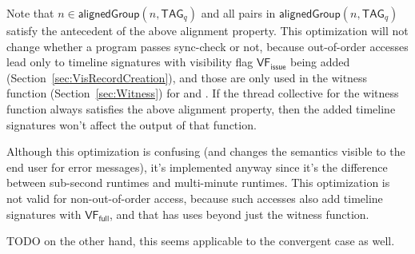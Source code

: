 Note that $n \in \mathsf{alignedGroup}(n, \mathsf{TAG}_q)$ and all pairs in $\mathsf{alignedGroup}(n, \mathsf{TAG}_q)$ satisfy the antecedent of the above alignment property.
This optimization will not change whether a program passes sync-check or not, because out-of-order accesses lead only to timeline signatures with visibility flag $\mathsf{VF_{issue}}$ being added (Section~\ref{sec:VisRecordCreation}), and those are only used in the witness function (Section~\ref{sec:Witness}) for  and .
If the thread collective for the witness function always satisfies the above alignment property, then the added timeline signatures won't affect the output of that function.

Although this optimization is confusing (and changes the semantics visible to the end user for error messages), it's implemented anyway since it's the difference between sub-second runtimes and multi-minute runtimes.
This optimization is not valid for non-out-of-order access, because such accesses also add timeline signatures with $\mathsf{VF_{full}}$, and that has uses beyond just the witness function.

TODO on the other hand, this seems applicable to the convergent case as well.


